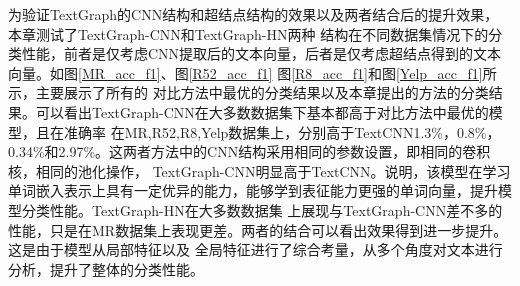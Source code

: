 为验证TextGraph的CNN结构和超结点结构的效果以及两者结合后的提升效果，本章测试了TextGraph-CNN和TextGraph-HN两种
结构在不同数据集情况下的分类性能，前者是仅考虑CNN提取后的文本向量，后者是仅考虑超结点得到的文本向量。如图\ref{MR_acc_f1}、图\ref{R52_acc_f1}
图\ref{R8_acc_f1}和图\ref{Yelp_acc_f1}所示，主要展示了所有的
对比方法中最优的分类结果以及本章提出的方法的分类结果。可以看出TextGraph-CNN在大多数数据集下基本都高于对比方法中最优的模型，且在准确率
在MR,R52,R8,Yelp数据集上，分别高于TextCNN1.3\%，0.8\%，0.34\%和2.97\%。这两者方法中的CNN结构采用相同的参数设置，即相同的卷积核，相同的池化操作，
TextGraph-CNN明显高于TextCNN。说明，该模型在学习单词嵌入表示上具有一定优异的能力，能够学到表征能力更强的单词向量，提升模型分类性能。TextGraph-HN在大多数数据集
上展现与TextGraph-CNN差不多的性能，只是在MR数据集上表现更差。两者的结合可以看出效果得到进一步提升。这是由于模型从局部特征以及
全局特征进行了综合考量，从多个角度对文本进行分析，提升了整体的分类性能。

